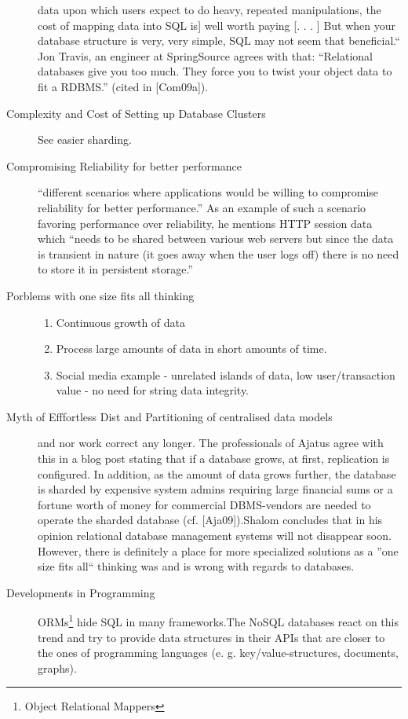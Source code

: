 \documentclass[a4paper,10pt,titlepage=false]{scrreprt}
\begin{document}
\begin{description}
data upon which users expect to do heavy, repeated manipulations, the cost of mapping data into
SQL is] well worth paying [. . . ] But when your database structure is very, very simple, SQL may not
seem that beneficial.“ Jon Travis, an engineer at SpringSource agrees with that: “Relational databases
give you too much. They force you to twist your object data to fit a RDBMS.” (cited in [Com09a]).
\item[Complexity and Cost of Setting up Database Clusters] See easier sharding.
\item[Compromising Reliability for better performance]  “different scenarios
where applications would be willing to compromise reliability for better performance.” As an example of
such a scenario favoring performance over reliability, he mentions HTTP session data which “needs to be
shared between various web servers but since the data is transient in nature (it goes away when the user
logs off) there is no need to store it in persistent storage.”
\item[Porblems with one size fits all thinking] \begin{enumerate}
  \item Continuous growth of data
  \item Process large amounts of data in short amounts of time.
  \item Social media example - unrelated islands of data, low user/transaction value - no need for string data integrity.
\end{enumerate}
\item[Myth of Efffortless Dist and Partitioning of centralised data models] and nor work correct any longer. The professionals of Ajatus agree with this in a blog post stating that
if a database grows, at first, replication is configured. In addition, as the amount of data grows further,
the database is sharded by expensive system admins requiring large financial sums or a fortune worth of
money for commercial DBMS-vendors are needed to operate the sharded database (cf. [Aja09]).Shalom concludes that in his opinion relational database management systems will not disappear soon.
However, there is definitely a place for more specialized solutions as a ”one size fits all“ thinking was and
is wrong with regards to databases.
\item[Developments in Programming] ORMs\footnote{Object Relational Mappers} hide SQL in many frameworks.The NoSQL databases react on this trend and try to provide data structures in their APIs that are closer to the ones of programming languages (e. g. key/value-structures, documents, graphs).

\end{description}
\end{document}
